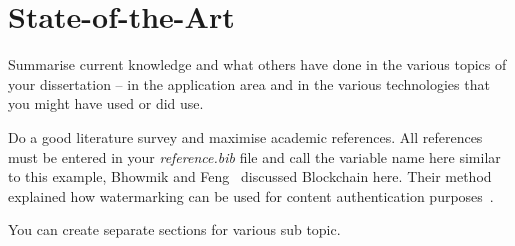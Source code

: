 \chapter{State-of-the-Art}
Summarise current knowledge and what others have done in the various topics of 
your dissertation -- in the application area and in the various technologies 
that you might have used or did use. 

Do a good literature survey and maximise academic references. All references 
must be entered in your \textit{reference.bib} file and call the variable name 
here similar to this example, Bhowmik and Feng~\cite{BhoFen17} discussed 
Blockchain here. Their method explained how watermarking can be used for 
content authentication purposes~\cite{BhoFen17}. 

You can create separate sections for various sub topic. 
